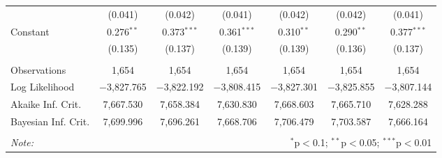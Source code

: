 \begin{sidewaystable}[!htbp]
\begin{tabular}{@{\extracolsep{5pt}}lcccccc}
  & (0.041) & (0.042) & (0.041) & (0.042) & (0.042) & (0.041) \\ 
  Constant & 0.276$^{**}$ & 0.373$^{***}$ & 0.361$^{***}$ & 0.310$^{**}$ & 0.290$^{**}$ & 0.377$^{***}$ \\ 
  & (0.135) & (0.137) & (0.139) & (0.139) & (0.136) & (0.137) \\ 
 \hline \\[-1.8ex] 
Observations & 1,654 & 1,654 & 1,654 & 1,654 & 1,654 & 1,654 \\ 
Log Likelihood & $-$3,827.765 & $-$3,822.192 & $-$3,808.415 & $-$3,827.301 & $-$3,825.855 & $-$3,807.144 \\ 
Akaike Inf. Crit. & 7,667.530 & 7,658.384 & 7,630.830 & 7,668.603 & 7,665.710 & 7,628.288 \\ 
Bayesian Inf. Crit. & 7,699.996 & 7,696.261 & 7,668.706 & 7,706.479 & 7,703.587 & 7,666.164 \\ 
\hline 
\hline \\[-1.8ex] 
\textit{Note:}  & \multicolumn{6}{r}{$^{*}$p$<$0.1; $^{**}$p$<$0.05; $^{***}$p$<$0.01} \\ 
\end{tabular} 
\end{sidewaystable} 
